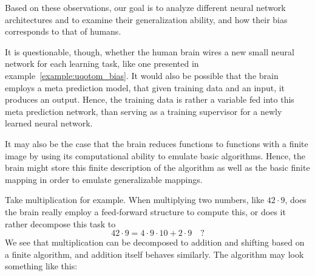\documentclass[../../main.tex]{subfiles}
\begin{document}
    Based on these observations, our goal is to analyze different neural network architectures and to examine their generalization ability, and how their bias corresponds to that of humans.

    \begin{remark}
        It is questionable, though, whether the human brain wires a new small neural network for each learning task, like one presented in example~\ref{example:uqotom_bias}. It would also be possible that the brain employs a meta prediction model, that given training data and an input, it produces an output. Hence, the training data is rather a variable fed into this meta prediction network, than serving as a training supervisor for a newly learned neural network.
    \end{remark}

    It may also be the case that the brain reduces functions to functions with a finite image by using its computational ability to emulate basic algorithms. Hence, the brain might store this finite description of the algorithm as well as the basic finite mapping in order to emulate generalizable mappings.

    \begin{example}
        Take multiplication for example. When multiplying two numbers, like $42 \cdot 9$, does the brain really employ a feed-forward structure to compute this, or does it rather decompose this task to
        \[
            42 \cdot 9 = 4 \cdot 9 \cdot 10 + 2 \cdot 9 \quad ?
        \]
        We see that multiplication can be decomposed to addition and shifting based on a finite algorithm, and addition itself behaves similarly. The algorithm may look something like this:
    \end{example}
\end{document}
